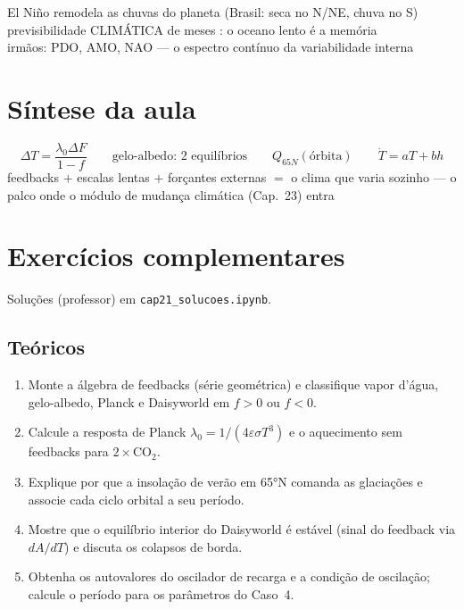 \documentclass[11pt]{article}
\begin{document}
\begin{noquadro}
El Niño remodela as chuvas do planeta (Brasil: seca no N/NE, chuva no
S)\\
previsibilidade CLIMÁTICA de meses :
o oceano lento é a memória\\
irmãos: PDO, AMO, NAO — o espectro contínuo da variabilidade interna
\end{noquadro}

\section{Síntese da aula}

\begin{noquadro}
\[ \Delta T = \frac{\lambda_0\Delta F}{1 - f} \qquad
\text{gelo-albedo: 2 equilíbrios} \qquad
Q_{65N}(\text{órbita}) \qquad
\dot T = aT + bh \]
feedbacks $+$ escalas lentas $+$ forçantes externas $=$ o clima que
varia sozinho — o palco onde o módulo de mudança climática (Cap.~23) entra
\end{noquadro}

\section{Exercícios complementares}\label{sec:exercicios}

Soluções (professor) em \texttt{cap21\_solucoes.ipynb}.

\subsection*{Teóricos}

\begin{enumerate}[label=\textbf{T\arabic*.},itemsep=4pt]
  \item Monte a álgebra de feedbacks (série geométrica) e classifique
        vapor d'água, gelo-albedo, Planck e Daisyworld em $f>0$ ou
        $f<0$.
  \item Calcule a resposta de Planck
        $\lambda_0 = 1/(4\varepsilon\sigma T^3)$ e o aquecimento sem
        feedbacks para $2\times$CO$_2$.
  \item Explique por que a insolação de verão em 65°N comanda as
        glaciações e associe cada ciclo orbital a seu período.
  \item Mostre que o equilíbrio interior do Daisyworld é estável
        (sinal do feedback via $dA/dT$) e discuta os colapsos de
        borda.
  \item Obtenha os autovalores do oscilador de recarga e a condição
        de oscilação; calcule o período para os parâmetros do
        Caso~4.
\end{enumerate}
\end{document}
